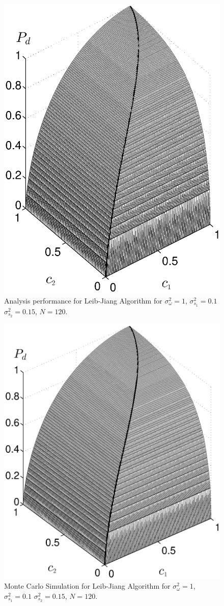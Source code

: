 \documentclass[12pt,journal,a4paper,twoside,onecolumn]{IEEEtran}
\begin{document}
\begin{spacing}{2.5}
\begin{figure}[!t]
\centering
\includegraphics[width=12cm]{simu_chi2ROC.eps}
\caption{Analysis performance for Leib-Jiang Algorithm for $\sigma_\omega^2=1$, $\sigma_{s_1}^2=0.1$ $\sigma_{s_2}^2 = 0.15$, $N=120$.}
\label{317}
\end{figure}

\begin{figure}[!t]
\centering
\includegraphics[width=12cm]{simu_c.eps}
\caption{Monte Carlo Simulation for Leib-Jiang Algorithm for $\sigma_\omega^2=1$, $\sigma_{s_1}^2=0.1$ $\sigma_{s_2}^2 = 0.15$, $N=120$.}
\label{pic: simulation result}
\end{figure}

\end{spacing}
\end{document}
